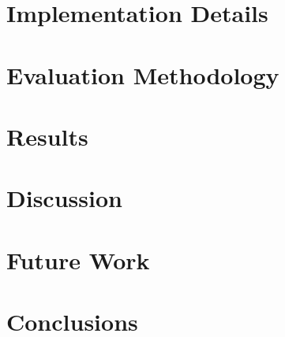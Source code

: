 \documentclass[a4paper,12pt]{article}
\begin{document}
\section{Implementation Details}
\label{sec:adaptations-impl}


\newpage
\section{Evaluation Methodology}
\label{sec:evaluation}


\section{Results}
\label{sec:results}


\newpage

\section{Discussion}
\label{sec:discussion}


\section{Future Work}
\label{sec:future-work}


\newpage
\section{Conclusions}
\label{sec:conclusions}


\newpage


%


%

\newpage
\appendix %

\end{document}
